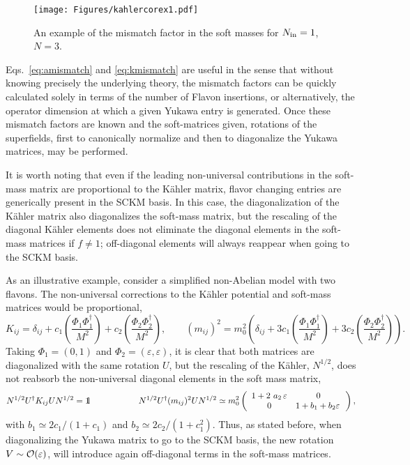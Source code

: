 \documentclass[a4paper,11pt]{article}
\newcommand{\vep}{\varepsilon}
\newcommand{\unity}{{\hbox{1\kern-.8mm l}}}
\begin{document}
\begin{figure} 
\center
\texttt{[image: Figures/kahlercorex1.pdf]}        
\caption{An example of the mismatch factor in the soft masses for $N_{\rm in}=1$, $N=3$.}
\label{fig:kahlercorex1}
\end{figure}

Eqs.~\ref{eq:amismatch} and \ref{eq:kmismatch} are useful in the sense that without knowing precisely the underlying theory, the mismatch factors can be quickly calculated solely in terms of the number of Flavon insertions, or alternatively, the operator dimension at which a given Yukawa entry is generated. Once these mismatch factors are known and the soft-matrices given, rotations of the superfields, first to canonically normalize \cite{King:2004tx} and then to diagonalize the Yukawa matrices, may be performed. 

It is worth noting that even if the leading non-universal contributions in the soft-mass matrix are proportional to the K\"ahler matrix, flavor changing entries are generically present in the SCKM basis. In this case, the diagonalization of the K\"ahler matrix also diagonalizes the soft-mass matrix, but the rescaling of the diagonal K\"ahler elements does not  
eliminate the diagonal elements in the soft-mass matrices if $f\neq 1$; off-diagonal elements will always reappear when going to the SCKM basis. 

As an illustrative example, consider a simplified non-Abelian model with two flavons. The non-universal corrections to the K\"ahler potential and soft-mass matrices would be proportional,
\begin{equation} \label{eq:km2ex}
 K_{ij} = \delta_{ij} + c_1 \left(\frac{\Phi_1 \Phi_1^\dagger}{M^2}\right) +  c_2 \left(\frac{\Phi_2 \Phi_2^\dagger}{M^2}\right), \qquad   (m_{ij})^2 = m_0^2 \left(\delta_{ij} + 3 c_1 \left(\frac{\Phi_1 \Phi_1^\dagger}{M^2}\right) +  3 c_2 \left(\frac{\Phi_2 \Phi_2^\dagger}{M^2}\right)\right) .
\end{equation}
Taking $\Phi_1=(0,1)$ and $\Phi_2=(\vep,\vep)$, it is clear that both matrices are diagonalized with the same rotation $U$, but the rescaling of the K\"ahler, $N^{1/2}$, does not reabsorb the non-universal diagonal elements in the soft mass matrix,
\begin{equation} \label{eq:km3}
N^{1/2} U^\dagger K_{ij} U N^{1/2} = \unity
\hspace{2.cm}
 N^{1/2} U^\dagger (m_{ij})^2 U  N^{1/2} \simeq m_0^2 \left(\begin{array}{cc}
               1 + 2~a_2\,\vep    &  0 \\
               0 & 1 + b_1 + b_2\vep \,   
               \end{array} \right),
\end{equation}
with $b_1 \simeq 2 c_1/(1+ c_1)$ and $b_2 \simeq 2 c_2/(1 + c_1^2)$. Thus, as stated before, when diagonalizing the Yukawa matrix to go to the SCKM basis, the new rotation $V \sim \cal{O} (\vep)$, will introduce again off-diagonal terms in the soft-mass matrices.
\end{document}
